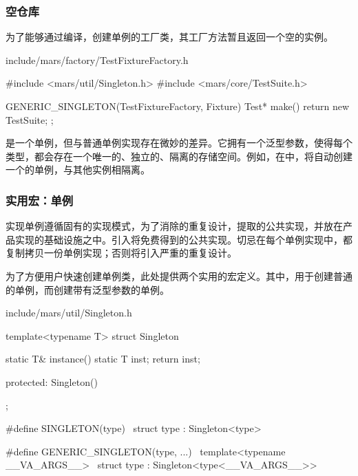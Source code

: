 \begin{content}
\subsubsection{空仓库}

为了能够通过编译，创建单例的工厂类，其工厂方法暂且返回一个空的实例。

\begin{nodiff}{include/mars/factory/TestFixtureFactory.h}
 \begin{c++}
#include <mars/util/Singleton.h>
#include <mars/core/TestSuite.h>

GENERIC_SINGLETON(TestFixtureFactory, Fixture) {
  Test* make() {
    return new TestSuite;
  }
};
 \end{c++}
\end{nodiff}

是一个单例，但与普通单例实现存在微妙的差异。它拥有一个泛型参数，使得每个类型，都会存在一个唯一的、独立的、隔离的存储空间。例如，在中，将自动创建一个的单例，与其他实例相隔离。

\subsubsection{实用宏：单例}

实现单例遵循固有的实现模式，为了消除的重复设计，提取的公共实现，并放在产品实现的基础设施之中。引入将免费得到的公共实现。切忌在每个单例实现中，都复制拷贝一份单例实现；否则将引入严重的重复设计。

为了方便用户快速创建单例类，此处提供两个实用的宏定义。其中，用于创建普通的单例，而创建带有泛型参数的单例。

\begin{nodiff}{include/mars/util/Singleton.h}
 \begin{c++}
template<typename T>
struct Singleton {
  static T& instance() {
    static T inst;
    return inst;
  }

protected:
  Singleton() {}
};

#define SINGLETON(type) \
  struct type : Singleton<type>

#define GENERIC_SINGLETON(type, ...)         \
  template<typename __VA_ARGS__>             \
  struct type : Singleton<type<__VA_ARGS__>>
 \end{c++}
\end{nodiff}


\end{content}

